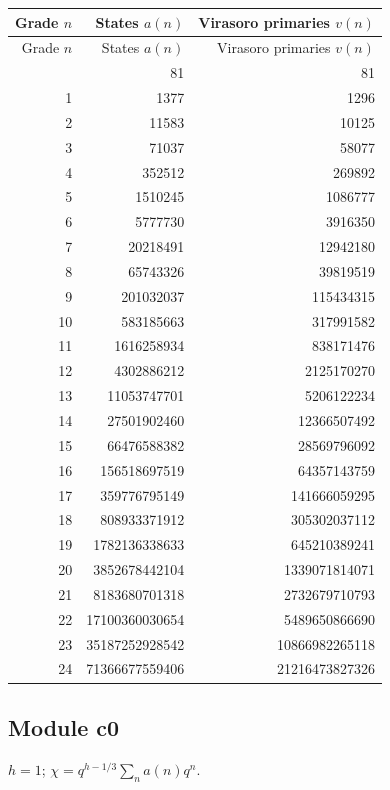 \begingroup\small
\setlength{\tabcolsep}{5pt}
\begin{longtable}{@{}rrr@{}}
\toprule
Grade $n$ & States $a(n)$ & Virasoro primaries $v(n)$\\
\midrule\endfirsthead
\toprule
Grade $n$ & States $a(n)$ & Virasoro primaries $v(n)$\\
\midrule\endhead
\bottomrule\endfoot
0 & 81 & 81\\
1 & 1377 & 1296\\
2 & 11583 & 10125\\
3 & 71037 & 58077\\
4 & 352512 & 269892\\
5 & 1510245 & 1086777\\
6 & 5777730 & 3916350\\
7 & 20218491 & 12942180\\
8 & 65743326 & 39819519\\
9 & 201032037 & 115434315\\
10 & 583185663 & 317991582\\
11 & 1616258934 & 838171476\\
12 & 4302886212 & 2125170270\\
13 & 11053747701 & 5206122234\\
14 & 27501902460 & 12366507492\\
15 & 66476588382 & 28569796092\\
16 & 156518697519 & 64357143759\\
17 & 359776795149 & 141666059295\\
18 & 808933371912 & 305302037112\\
19 & 1782136338633 & 645210389241\\
20 & 3852678442104 & 1339071814071\\
21 & 8183680701318 & 2732679710793\\
22 & 17100360030654 & 5489650866690\\
23 & 35187252928542 & 10866982265118\\
24 & 71366677559406 & 21216473827326\\
\end{longtable}
\endgroup

\subsection{Module c0}
$h=1$; $\chi=q^{h-1/3}\sum_n a(n)q^n$.

